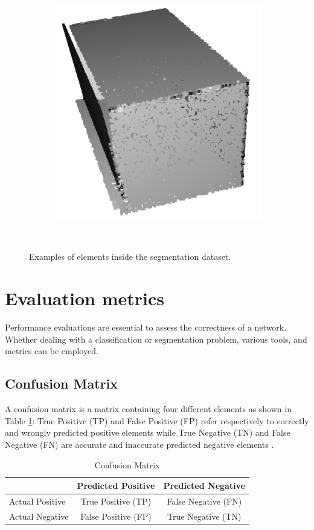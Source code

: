 \begin{figure}[ht]
\begin{subfigure}{.32\linewidth}
    \caption{}
    \label{fig:seg_target1}
    \end{subfigure}
    \begin{subfigure}{0.32\linewidth}
    \centering
    \includegraphics[scale=0.4]{Img/06_room3.png}
    \caption{}
    \label{fig:seg_target2}
    \end{subfigure}\\
    \caption{Examples of elements inside the segmentation dataset.}
    \label{fig:segmentation_dataset}
\end{figure}

\section{Evaluation metrics}
Performance evaluations are essential to assess the correctness of a network. Whether dealing with a classification or segmentation problem, various tools, and metrics can be employed.

\subsection{Confusion Matrix}
A confusion matrix is a matrix containing four different elements as shown in Table \ref{tab:05_confusion_matrix}: True Positive (TP) and False Positive (FP) refer respectively to correctly and wrongly predicted positive elements while True Negative (TN) and False Negative (FN) are accurate and inaccurate predicted negative elements \cite{eval_metrics}.
\begin{table}[h]
    \centering
    \begin{tabular}{|l||c|c|} \hline 
         &  Predicted Positive & Predicted Negative\\ \hline \hline
        Actual Positive &  True Positive (TP) & False Negative (FN)\\ \hline
        Actual Negative &  False Positive (FP) & True Negative (TN) \\ \hline
    \end{tabular}
    \caption{Confusion Matrix}
    \label{tab:05_confusion_matrix}
\end{table}
